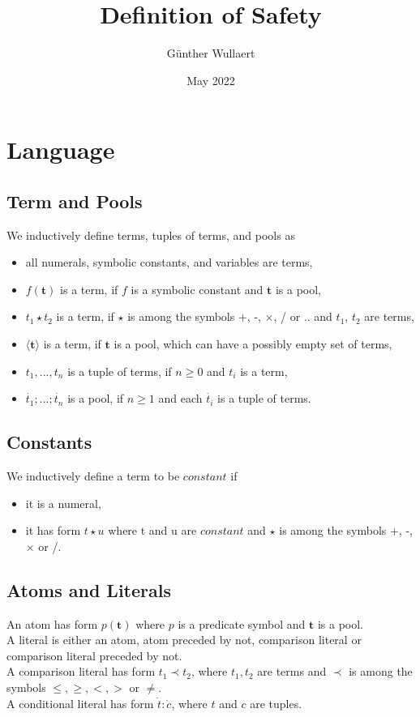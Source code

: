 \documentclass{article}
\title{Definition of Safety}
\author{Günther Wullaert}
\date{May 2022}
\newcommand{\pool}[1]{\boldsymbol{#1}}
\newcommand{\tuple}[1]{\dot{#1}}
\begin{document}
	\maketitle
	
	\section{Language}
	\subsection{Term and Pools}
	
	We inductively define terms, tuples of terms, and pools as
	\begin{itemize}
		\item all numerals, symbolic constants, and variables are terms,
		\item $f(\pool{t})$ is a term, if $f$ is a symbolic constant and $\pool{t}$ is a pool,
		\item $t_1 \star t_2$ is a term, if $\star$ is among the symbols +, -, $\times$, / or .. and $t_1$, $t_2$ are terms,
		\item $\langle \pool{t} \rangle$ is a term, if $\pool{t}$ is a pool, which can have a possibly empty set of terms,
		\item $t_1,...,t_n$ is a tuple of terms, if $n \ge 0$ and $t_i$ is a term,
  		\item $\tuple{t_1};...;\tuple{t_n}$ is a pool, if $n \ge 1$ and each $\tuple{t_i}$ is a tuple of terms.
	\end{itemize}

	\subsection{Constants}

	We inductively define a term to be $\mathit{constant}$ if
	\begin{itemize}
		\item it is a numeral,
		\item it has form $t \star u$ where t and u are $\mathit{constant}$ and $\star$ is among the symbols +, -, $\times$ or /.
	\end{itemize}

	\subsection{Atoms and Literals}
	
	An atom has form $p(\pool{t})$ where $p$ is a predicate symbol and $\pool{t}$ is a pool. 
	\\
	A literal is either an atom, atom preceded by not, comparison literal or comparison literal preceded by not.
	\\
	A comparison literal has form $t_1 \prec t_2$, where $t_1,t_2$ are terms and $\prec$ is among the symbols $\leq,\ge,<,>$ or $\neq$.
	\\
	A conditional literal has form $\tuple{t} : \tuple{c}$, where $t$ and $c$ are tuples.
\end{document}
